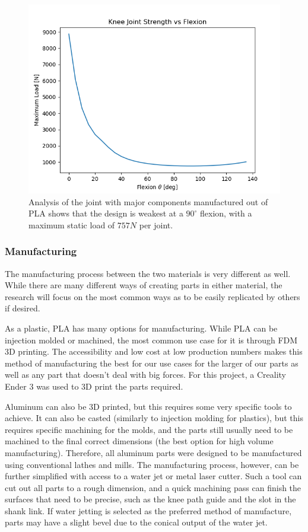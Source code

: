 \begin{figure}[ht!]
    \centering
    \includegraphics[width=0.8\linewidth]{Figures/Design/StrengthFlexionCurve.png}
    \caption{Analysis of the joint with major components manufactured out of PLA shows that the design is weakest at a \(90^\circ\) flexion, with a maximum static load of \(757N\) per joint.}
    \label{fig:StrengthFlexion}
\end{figure}

\subsubsection{Manufacturing}

The manufacturing process between the two materials is very different as well. While there are many different ways of creating parts in either material, the research will focus on the most common ways as to be easily replicated by others if desired.

As a plastic, PLA has many options for manufacturing. While PLA can be injection molded or machined, the most common use case for it is through FDM 3D printing. The accessibility and low cost at low production numbers makes this method of manufacturing the best for our use cases for the larger of our parts as well as any part that doesn't deal with big forces. For this project, a Creality Ender 3 was used to 3D print the parts required. 

Aluminum can also be 3D printed, but this requires some very specific tools to achieve. It can also be casted (similarly to injection molding for plastics), but this requires specific machining for the molds, and the parts still usually need to be machined to the final correct dimensions (the best option for high volume manufacturing). Therefore, all aluminum parts were designed to be manufactured using conventional lathes and mills. The manufacturing process, however, can be further simplified with access to a water jet or metal laser cutter. Such a tool can cut out all parts to a rough dimension, and a quick machining pass can finish the surfaces that need to be precise, such as the knee path guide and the slot in the shank link. If water jetting is selected as the preferred method of manufacture, parts may have a slight bevel due to the conical output of the water jet.

